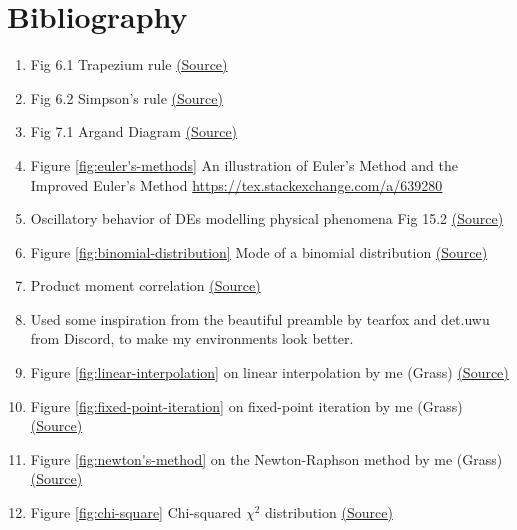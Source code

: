 \documentclass[oneside]{book}
\begin{document}






\chapter{Bibliography}
\begin{enumerate}
  \item Fig 6.1 Trapezium rule \href{https://tex.stackexchange.com/a/110618}{(Source)}
  \item Fig 6.2 Simpson's rule \href{https://tex.stackexchange.com/a/439119}{(Source)}
  \item Fig 7.1 Argand Diagram \href{https://tex.stackexchange.com/a/466846}{(Source)}
  \item Figure \ref{fig:euler's-methods} An illustration of Euler's Method and the Improved Euler's Method \url{https://tex.stackexchange.com/a/639280}
  \item Oscillatory behavior of DEs modelling physical phenomena Fig 15.2 \href{https://tikz.net/dynamics_oscillator/}{(Source)}
  \item Figure \ref{fig:binomial-distribution} Mode of a binomial distribution \href{https://tex.stackexchange.com/a/209658}{(Source)}
  \item Product moment correlation \href{https://www.ncl.ac.uk/webtemplate/ask-assets/external/maths-resources/images/R_value.png}{(Source)}
  \item Used some inspiration from the beautiful preamble by tearfox and det.uwu from Discord, to make my environments look better.
  \item Figure \ref{fig:linear-interpolation} on linear interpolation by me (Grass) \href{https://www.desmos.com/calculator/jp52nra5le}{(Source)}
  \item Figure \ref{fig:fixed-point-iteration} on fixed-point iteration by me (Grass) \href{https://www.desmos.com/calculator/t9mnqtmhxw}{(Source)}
  \item Figure \ref{fig:newton's-method} on the Newton-Raphson method by me (Grass) \href{https://www.desmos.com/calculator/izkg4ynlfp}{(Source)}
  \item Figure \ref{fig:chi-square} Chi-squared \(\chi^2\) distribution \href{https://commons.wikimedia.org/wiki/File:Chi-square_pdf.svg}{(Source)}
\end{enumerate}
\end{document}
